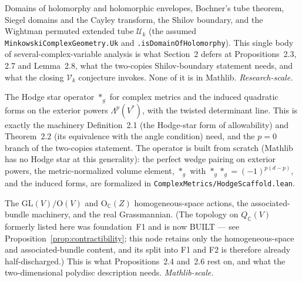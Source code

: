 \begin{definition}
  \label{found:scv-tube-domain}
  \notready
  Domains of holomorphy and holomorphic envelopes, Bochner's tube theorem, Siegel domains
  and the Cayley transform, the Shilov boundary, and the Wightman permuted extended tube
  $\mathcal U_k$ (the assumed \texttt{MinkowskiComplexGeometry.Uk} and
  \texttt{.isDomainOfHolomorphy}). This single body of several-complex-variable analysis is
  what Section~2 defers at Propositions~2.3, 2.7 and Lemma~2.8, what the two-copies
  Shilov-boundary statement needs, and what the closing $\mathcal V_k$ conjecture invokes.
  None of it is in Mathlib. \emph{Research-scale.}
\end{definition}

\begin{definition}
  \label{found:hodge-star}
  \leanok
  The Hodge star operator $*_g$ for complex metrics and the induced quadratic forms on the
  exterior powers $\Lambda^p(V^*)$, with the twisted determinant line. This is exactly the
  machinery Definition~2.1 (the Hodge-star form of allowability) and Theorem~2.2 (its
  equivalence with the angle condition) need, and the $p=0$ branch of the two-copies
  statement. The operator is built from scratch (Mathlib has no Hodge star at this
  generality): the perfect wedge pairing on exterior powers, the metric-normalized volume
  element, $*_g$ with $*_g*_g = (-1)^{p(d-p)}$, and the induced forms, are formalized in
  \texttt{ComplexMetrics/HodgeScaffold.lean}.
\end{definition}

\begin{definition}
  \label{found:homogeneous-bundles}
  \notready
  The $\mathrm{GL}(V)/\mathrm O(V)$ and $\mathrm O_{\mathbb C}(Z)$ homogeneous-space actions,
  the associated-bundle machinery, and the real Grassmannian. (The topology on
  $Q_{\mathbb C}(V)$ formerly listed here was foundation~F1 and is now BUILT --- see
  Proposition~\ref{prop:contractibility}; this node retains only the
  homogeneous-space and associated-bundle content, and its split into F1 and F2 is
  therefore already half-discharged.) This is what Propositions~2.4
  and~2.6 rest on, and what the two-dimensional polydisc description needs.
  \emph{Mathlib-scale.}
\end{definition}

